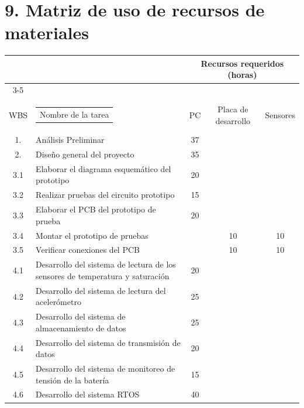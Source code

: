 \documentclass[11pt]{charter}
\begin{document}
\section{9. Matriz de uso de recursos de materiales}
\label{sec:recursos}
\begin{table}[!hbt]
\label{tab:recursos}
\begin{tabularx}{\linewidth}{@{}|c|X|c|c|c|@{}}
\hline
\cellcolor[HTML]{C0C0C0} & \cellcolor[HTML]{C0C0C0} & \multicolumn{3}{c|}{\cellcolor[HTML]{C0C0C0}Recursos requeridos (horas)} \\ \cline{3-5} 
\multirow{-2}{*}{\cellcolor[HTML]{C0C0C0}\begin{tabular}[c]{@{}c@{}}Código\\ WBS\end{tabular}} & 
\multirow{-2}{*}{\cellcolor[HTML]{C0C0C0}\begin{tabular}[c]{@{}c@{}}Nombre de la tarea\end{tabular}} & PC & Placa de desarrollo & Sensores \\ \hline
 1.  & Análisis Preliminar & 37 & &  \\ \hline
 2.  & Diseño general del proyecto & 35 &  & \\ \hline
 3.1  & Elaborar el diagrama esquemático del prototipo & 20 &  & \\ \hline 
 3.2  & Realizar pruebas del circuito prototipo & 15  &  & \\ \hline
 3.3  & Elaborar el PCB del prototipo de prueba & 20 &  & \\ \hline
 3.4  & Montar el prototipo de pruebas & & 10 & 10  \\ \hline
 3.5  & Verificar conexiones del PCB & & 10 & 10   \\ \hline
 4.1  & Desarrollo del sistema de lectura de los sensores de temperatura y saturación & 20 &  &    \\ \hline
 4.2  & Desarrollo del sistema de lectura del acelerómetro & 25 & &   \\ \hline
 4.3  & Desarrollo del sistema de almacenamiento de datos & 25 &  &    \\ \hline
 4.4  & Desarrollo del sistema de transmisión de datos & 20 &  &    \\ \hline
 4.5  & Desarrollo del sistema de monitoreo de tensión de la batería & 15  &  &   \\ \hline
 4.6  & Desarrollo del sistema RTOS & 40  &  &  \\ \hline

\end{tabularx}
\end{table}
\end{document}

